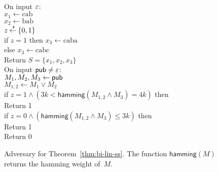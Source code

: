 \begin{figure}
\centering
{}
{
\\
On input $\varepsilon$:\\
\nudge $x_1 \gets \mathrm{cab}$\\
\nudge $x_2 \gets \mathrm{bab}$\\
\nudge $z {\:\stackrel{{\scriptscriptstyle \hspace{0.2em}\$}} {\leftarrow}\:} \{0,1\}$\\
\nudge if $z=1$ then $x_3 \gets \mathrm{caba}$\\
\nudge else $x_3 \gets \mathrm{cabc}$\\
\nudge Return $S=\{x_1,x_2,x_3\}$\\
On input ${\sf pub} \neq \varepsilon$:\\
\nudge $M_1,M_2,M_3 \gets {\sf pub}$\\
\nudge $M_{1,2} \gets M_1 \vee M_2$\\
\nudge if $z=1 \wedge \left(3k < \mathsf{hamming}(M_{1,2} \wedge M_3) = 4k\right)$ then \\
\nudge\nudge Return 1 \\
\nudge if $z=0 \wedge \left(\mathsf{hamming}(M_{1,2} \wedge M_3) \leq 3k\right)$ then \\
\nudge\nudge Return 1 \\
\nudge Return 0
}
\caption{Adversary for Theorem~\ref{thm:bi-lin-ss}. The function $\mathsf{hamming}(M)$ returns the hamming weight of~$M$.}
\label{fig:adv-bi-lin-ss}
\end{figure}

